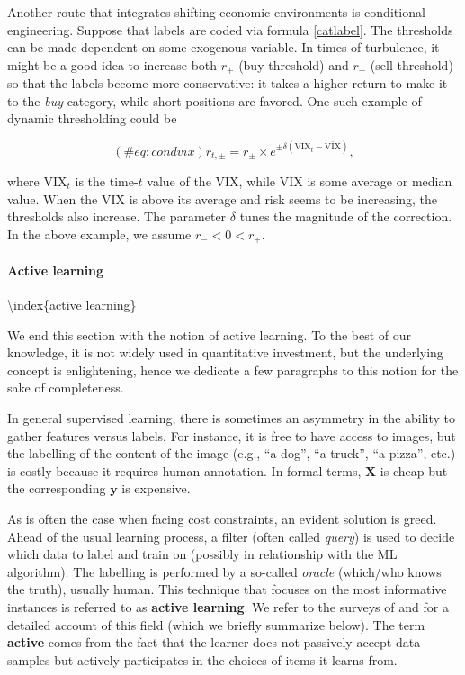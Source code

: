 Another route that integrates shifting economic environments is conditional engineering. Suppose that labels are coded via formula \ref{catlabel}. The thresholds can be made dependent on some exogenous variable. In times of turbulence, it might be a good idea to increase both $r_+$ (buy threshold) and $r_ -$ (sell threshold) so that the labels become more conservative: it takes a higher return to make it to the \textit{buy} category, while short positions are favored. One such example of dynamic thresholding could be

\begin{equation}
(\#eq:condvix)
r_{t,\pm}=r_{\pm} \times e^{\pm\delta(\text{VIX}_t-\bar{\text{VIX}})},
\end{equation}

where $\text{VIX}_t$ is the time-$t$ value of the VIX, while $\bar{\text{VIX}}$ is some average or median value. When the VIX is above its average and risk seems to be increasing, the thresholds also increase. The parameter $\delta$ tunes the magnitude of the correction. In the above example, we assume $r_ -<0<r_+$.

\paragraph{Active learning}

{\textbackslash}index\{active learning\}

We end this section with the notion of active learning. To the best of our knowledge, it is not widely used in quantitative investment, but the underlying concept is enlightening, hence we dedicate a few paragraphs to this notion for the sake of completeness.

In general supervised learning, there is sometimes an asymmetry in the ability to gather features versus labels. For instance, it is free to have access to images, but the labelling of the content of the image (e.g., ``a dog'', ``a truck'', ``a pizza'', etc.) is costly because it requires human annotation. In formal terms, $\textbf{X}$ is cheap but the corresponding $\textbf{y}$ is expensive.

As is often the case when facing cost constraints, an evident solution is greed. Ahead of the usual learning process, a filter (often called \textit{query}) is used to decide which data to label and train on (possibly in relationship with the ML algorithm). The labelling is performed by a so-called \textit{oracle} (which/who knows the truth), usually human. This technique that focuses on the most informative instances is referred to as \textbf{active learning}. We refer to the surveys of \cite{settles2009active} and \cite{settles2012active} for a detailed account of this field (which we briefly summarize below). The term \textbf{active} comes from the fact that the learner does not passively accept data samples but actively participates in the choices of items it learns from.

